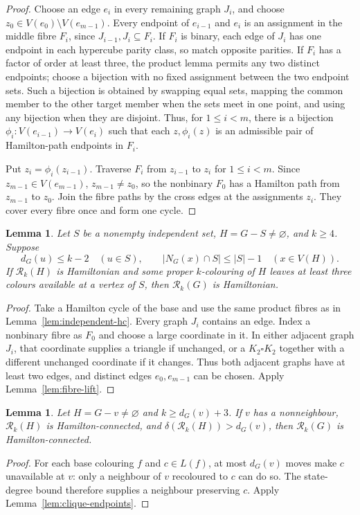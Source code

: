 \documentclass[11pt]{article}
\newtheorem{lemma}[theorem]{Lemma}
\theoremstyle{remark}
\newcommand{\Rk}{\mathcal R_k}
\numberwithin{equation}{section}
\numberwithin{table}{section}
\begin{document}
\begin{proof}
Choose an edge $e_i$ in every remaining graph $J_i$, and choose
$z_0\in V(e_0)\setminus V(e_{m-1})$.  Every endpoint of
$e_{i-1}$ and $e_i$ is an assignment in the middle fibre $F_i$, since
$J_{i-1},J_i\subseteq F_i$.  If $F_i$ is binary, each edge of $J_i$
has one endpoint in each hypercube parity class, so match opposite
parities.  If $F_i$ has a factor of order at least three, the product
lemma permits any two distinct endpoints; choose a bijection with no
fixed assignment between the two endpoint sets.  Such a
bijection is obtained by swapping equal sets, mapping the common member
to the other target member when the sets meet in one point, and using any
bijection when they are disjoint.  Thus, for $1\le i<m$, there is a
bijection $\phi_i:V(e_{i-1})\to V(e_i)$ such that each
$z,\phi_i(z)$ is an admissible pair of Hamilton-path endpoints in
$F_i$.

Put $z_i=\phi_i(z_{i-1})$.  Traverse $F_i$ from $z_{i-1}$ to $z_i$
for $1\le i<m$.  Since $z_{m-1}\in V(e_{m-1})$,
$z_{m-1}\ne z_0$, so the nonbinary $F_0$ has a Hamilton path from
$z_{m-1}$ to $z_0$.  Join the fibre paths by the cross edges at the
assignments $z_i$.  They cover every fibre once and form one cycle.
\end{proof}

\begin{lemma}
\label{lem:independent-restoration}
Let $S$ be a nonempty independent set, $H=G-S\ne\varnothing$, and
$k\ge4$.  Suppose
\[
 d_G(u)\le k-2\quad(u\in S),\qquad
 |N_G(x)\cap S|\le |S|-1\quad(x\in V(H)).
\]
If $\Rk(H)$ is Hamiltonian and some proper $k$-colouring of $H$ leaves
at least three colours available at a vertex of $S$, then $\Rk(G)$ is
Hamiltonian.
\end{lemma}

\begin{proof}
Take a Hamilton cycle of the base and use the same product fibres as in
Lemma~\ref{lem:independent-hc}.  Every graph $J_i$ contains an edge.
Index a nonbinary fibre as $F_0$ and choose a large coordinate in it.
In either adjacent graph $J_i$, that coordinate supplies a triangle if
unchanged, or a $K_2\square K_2$ together with a different unchanged
coordinate if it changes.  Thus both adjacent graphs have at least
two edges, and distinct edges $e_0,e_{m-1}$ can be chosen.  Apply
Lemma~\ref{lem:fibre-lift}.
\end{proof}

\begin{lemma}\label{lem:single-hc}
Let $H=G-v\ne\varnothing$ and $k\ge d_G(v)+3$.
If $v$ has a nonneighbour, $\Rk(H)$ is Hamilton-connected, and
$\delta(\Rk(H))>d_G(v)$, then $\Rk(G)$ is Hamilton-connected.
\end{lemma}
\begin{proof}
For each base colouring $f$ and $c\in L(f)$, at most $d_G(v)$
moves make $c$ unavailable at $v$: only a neighbour of $v$
recoloured to $c$ can do so. The state-degree bound therefore
supplies a neighbour preserving $c$.
Apply Lemma~\ref{lem:clique-endpoints}.
\end{proof}
\end{document}
